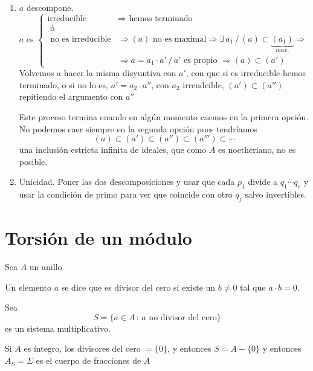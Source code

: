 \begin{dem} \, 
    \begin{enumerate}
        \item $a$ descompone.
        $$a \text{ es } \begin{cases}
            \text{irreducible} & \Rightarrow \text{ hemos terminado}\\ \text{ \'o} \\\text{ no es irreducible} & \Rightarrow (a) \text{ no es maximal} \Rightarrow \exists\,  a_1 \, / \, (a) \subset \underbrace{(a_1)}_{max.} \Rightarrow \\ & \Rightarrow a=a_1\cdot a' \, / \, a' \text{ es propio } \Rightarrow (a) \subset (a')
        \end{cases}$$
        Volvemos a hacer la misma disyuntiva con $a'$, con que si es irreducible hemos terminado, o si no lo es, $a' = a_2 \cdot a''$, con $a_2$ irreudcible, $(a') \subset (a'')$ repitiendo el argumento con $a''$

        Este proceso termina cuando en alg\'un momento caemos en la primera opci\'on. No podemos caer siempre en la segunda opci\'on pues tendr\'iamos 
        $$(a) \subset (a') \subset (a'') \subset (a''') \subset \cdots $$
        una inclusi\'on estricta infinita de ideales, que como $A$ es noetheriano, no es posible. 

        \item Unicidad. Poner las dos descomposiciones y usar que cada $p_1$ divide a $q_1\cdots q_r$ y usar la condici\'on de primo para ver que coincide con otro $q_j$ salvo invertibles. 
    \end{enumerate}
\end{dem}
\section{Torsi\'on de un m\'odulo}
Sea $A$ un anillo
\begin{defi}
    Un elemento $a$ se dice que es divisor del cero si existe un $b \neq 0$ tal que $a\cdot b=0$. 
\end{defi}
Sea 
$$S = \{a\in A \,  : \, a \text{ no divisor del cero}\}$$
es un sistema multiplicativo. 

Si $A$ es \'integro, los divisores del cero $=\{0\}$, y entonces $S = A-\{0\}$ y entonces $A_S = \Sigma$ es el cuerpo de fracciones de $A$

